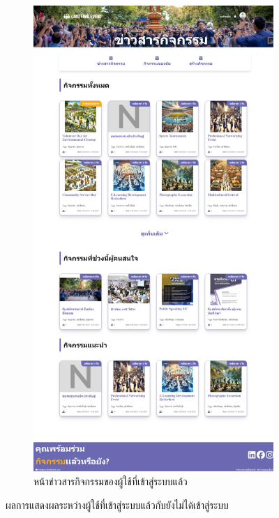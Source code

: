 \begin{figure}[h]
\begin{subfigure}[b]{0.4\linewidth}
    \includegraphics[width=\linewidth]{image/web/activity.jpeg}
    \caption{หน้าข่าวสารกิจกรรมของผู้ใช้ที่เข้าสู่ระบบแล้ว}
  \end{subfigure}
  \caption{ผลการแสดงผลระหว่างผู้ใช้ที่เข้าสู่ระบบแล้วกับยังไม่ได้เข้าสู่ระบบ}
  \label{fig:loginShow}
\end{figure}

